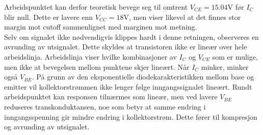 \noindent
Arbeidspunktet kan derfor teoretisk bevege seg til omtrent $V_{CE}=15.04\text{V}$ før $I_C$ blir null. Dette er lavere enn $V_{CC}=18\text{V}$, men viser likevel at det finnes stor margin mot cutoff sammenlignet med marginen mot metning.
\\[1em]
Selv om signalet ikke nødvendigvis klippes hardt i denne retningen, observeres en avrunding av utsignalet. Dette skyldes at transistoren ikke er lineær over hele arbeidslinja. Arbeidslinja viser hvilke kombinasjoner av $I_C$ og $V_{CE}$ som er mulige, men ikke at bevegelsen mellom punktene skjer lineært. Når $I_C$ minker, minker også $V_{BE}$. På grunn av den eksponentielle diodekarakteristikken mellom base og emitter vil kollektorstrømmen ikke lenger følge inngangssignalet lineært. Rundt arbeidspunktet kan responsen tilnærmes som lineær, men ved lavere $V_{BE}$ reduseres transkonduktansen, noe som betyr at samme endring i inngangsspenning gir mindre endring i kollektorstrøm. Dette fører til kompresjon og avrunding av utsignalet.